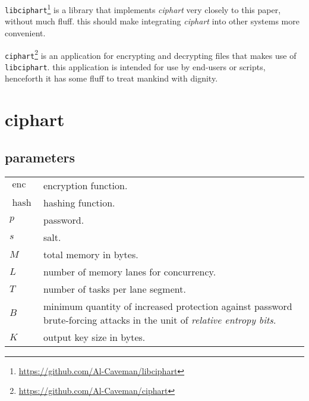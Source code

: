 \documentclass[twocolumn]{article}
\DeclareMathOperator{\enc}{enc}
\DeclareMathOperator{\hash}{hash}
\begin{document}
\texttt{libciphart}\footnote{\url{https://github.com/Al-Caveman/libciphart}}
is a library that implements \emph{ciphart} very closely to this paper,
without much fluff.  this should make integrating \emph{ciphart} into other
systems more convenient.

\texttt{ciphart}\footnote{\url{https://github.com/Al-Caveman/ciphart}} is
an application for encrypting and decrypting files that makes use of
\texttt{libciphart}.  this application is intended for use by end-users or
scripts, henceforth it has some fluff to treat mankind with dignity.
\vfill
\break

\tableofcontents

\section{ciphart}
\subsection{parameters}
\begin{tabularx}{\columnwidth}{lX}
    $\enc$ & encryption function.\\
    $\hash$ & hashing function.\\
    $p$ & password.\\
    $s$ & salt.\\
    $M$ & total memory in bytes.\\
    $L$ & number of memory lanes for concurrency.\\
    $T$ & number of tasks per lane segment.\\
    $B$ & minimum quantity of increased protection against password
            brute-forcing attacks in the unit of \emph{relative entropy
            bits}.\\
    $K$ & output key size in bytes.\\
\end{tabularx}
\end{document}
